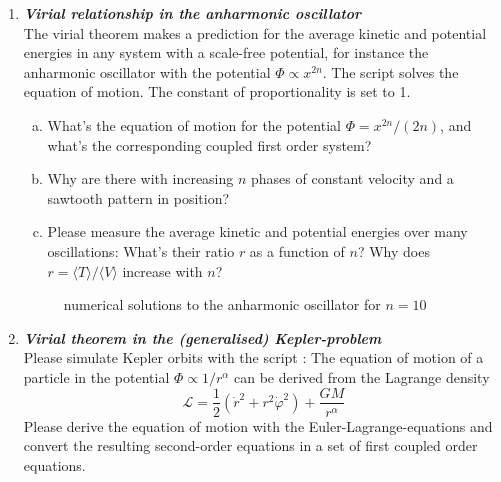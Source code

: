 \documentclass[a4paper,12pt]{article}
\newcommand{\question}[1]{\textbf{\textit{#1}}}
\newcommand{\bra}{\langle}
\newcommand{\ket}{\rangle}
\begin{document}
\begin{enumerate}
\item \question{Virial relationship in the anharmonic oscillator}\\
The virial theorem makes a prediction for the average kinetic and potential energies in any system with a scale-free potential, for instance the anharmonic oscillator with the potential $\Phi\propto x^{2n}$. The script  solves the equation of motion. The constant of proportionality is set to 1.
\begin{enumerate}[(a)]
\item{What's the equation of motion for the potential $\Phi=x^{2n}/(2n)$, and what's the corresponding coupled first order system?}
\item{Why are there with increasing $n$ phases of constant velocity and a sawtooth pattern in position?}
\item{Please measure the average kinetic and potential energies over many oscillations: What's their ratio $r$ as a function of $n$? Why does $r=\bra T\ket/\bra V\ket$ increase with $n$?}
\end{enumerate}

\begin{figure}[h]
\begin{center}
\caption{numerical solutions to the anharmonic oscillator for $n=10$}
\end{center}
\end{figure}


\item \question{Virial theorem in the (generalised) Kepler-problem}\\
Please simulate Kepler orbits with the script : The equation of motion of a particle in the potential $\Phi\propto 1/r^\alpha$ can be derived from the Lagrange density
\begin{equation}
\mathcal{L} = \frac{1}{2}\left(\dot{r}^2+r^2\dot{\varphi}^2\right) + \frac{GM}{r^\alpha}
\end{equation}
Please derive the equation of motion with the Euler-Lagrange-equations and convert the resulting second-order equations in a set of first coupled order equations.


\end{enumerate}
\end{document}
